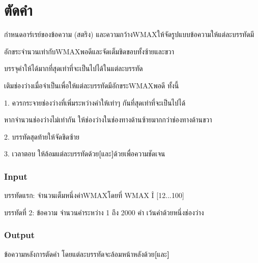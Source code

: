 \documentclass{article}
\begin{document}
\section*{ตัดคำ}

กำหนดอาร์เรย์ของข้อความ (สตริง) และความกว้างWMAXให้จัดรูปแบบข้อความให้แต่ละบรรทัดมี



อักขระจำนวนเท่ากับWMAXพอดีและจัดเต็มชิดขอบทั้งซ้ายและขวา

บรรจุคำให้ได้มากที่สุดเท่าที่จะเป็นไปได้ในแต่ละบรรทัด

เติมช่องว่างเมื่อจำเป็นเพื่อให้แต่ละบรรทัดมีอักขระWMAXพอดี ทั้งนี้



1. ควรกระจายช่องว่างที่เพิ่มระหว่างคำให้เท่าๆ กันที่สุดเท่าที่จะเป็นไปได้

หากจำนวนช่องว่างไม่เท่ากัน ให้ช่องว่างในช่องทางด้านซ้ายมากกว่าช่องทางด้านขวา



2. บรรทัดสุดท้ายให้จัดชิดซ้าย



3. เวลาตอบ ให้ล้อมแต่ละบรรทัดด้วย\textbf{{[}}และ\textbf{{]}}ด้วยเพื่อความชัดเจน



\subsubsection{\texorpdfstring{{Input}}{Input}}\label{input}



บรรทัดแรก: จำนวนเต็มหนึ่งค่าWMAXโดยที่ WMAX Î {[}12...100{]}



บรรทัดที่ 2: ข้อความ จำนวนคำระหว่าง 1 ถึง 2000 คำ เว้นคำด้วยหนึ่งช่องว่าง



\subsubsection{\texorpdfstring{{Output}}{Output}}\label{output}



ข้อความหลังการตัดคำ โดยแต่ละบรรทัดจะล้อมหน้าหลังด้วย\textbf{{[}}และ\textbf{{]}}
\end{document}
